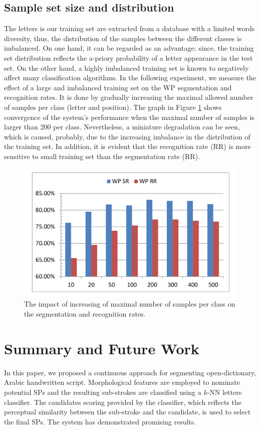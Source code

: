 \documentclass[10pt, conference, compsocconf]{IEEEtran}
\begin{document}
\subsection{Sample set size and distribution}
The letters is our training set are extracted from a database with a limited words diversity, thus, the distribution of the samples between the different classes is imbalanced. 
On one hand, it can be regarded as an advantage; since, the training set distribution reflects the a-priory probability of a letter appearance in the test set. 
On the other hand, a highly imbalanced training set is known to negatively affect many classification algorithms.
In the following experiment, we measure the effect of a large and imbalanced training set on the WP segmentation and recognition rates. 
It is done by gradually increasing the maximal allowed number of samples per class (letter and position). 
The graph in Figure \ref{fig:num_letter_impact} shows convergence of the system's performance when the maximal number of samples is larger than 200 per class. 
Nevertheless, a miniature degradation can be seen, which is caused, probably, due to the increasing imbalance in the distribution of the training set.
In addition, it is evident that the recognition rate (RR) is more sensitive to small training set than the segmentation rate (RR).

\begin{figure}
\centering
\includegraphics[width=1\columnwidth]{./figures/num_letter_impact}
\caption{The impact of increasing of maximal number of samples per class on the segmentation and recognition rates.}
\label{fig:num_letter_impact}
\end{figure}

\section{Summary and Future Work}
In this paper, we proposed a continuous approach for segmenting open-dictionary, Arabic handwritten script. Morphological features are employed to nominate potential SPs and the resulting sub-strokes are classified using a $k$-NN letters classifier.
The candidates scoring provided by the classifier, which reflects the perceptual similarity between the sub-stroke and the candidate, is used to select the final SPs. 
The system has demonstrated promising results.\\
\end{document}
